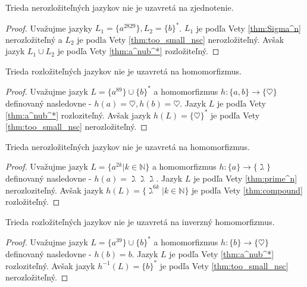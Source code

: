 \begin{theorem}
Trieda nerozložiteľných jazykov nie je uzavretá na zjednotenie.
\end{theorem}

\begin{proof}
Uvažujme jazyky $ L_1 = \lbrace a^{2829} \rbrace, L_2 = \lbrace b \rbrace^* $. $ L_1 $ je podľa Vety \ref{thm:Sigma^n} nerozložiteľný a $ L_2 $ je podla Vety \ref{thm:too_small_nsc} nerozložiteľný. Avšak jazyk $ L_1 \cup L_2 $ je podľa Vety \ref{thm:a^nub^*} rozložiteľný.
\end{proof}

\begin{theorem}
Trieda rozložiteľných jazykov nie je uzavretá na homomorfizmus.
\end{theorem}

\begin{proof}
Uvažujme jazyk $ L = \lbrace a^{89} \rbrace \cup \lbrace b \rbrace^* $ a homomorfizmus $ h : \lbrace a,b \rbrace \rightarrow \lbrace \heartsuit \rbrace $ definovaný nasledovne - $ h(a) = \heartsuit, h(b) = \heartsuit $. Jazyk $ L $ je podľa Vety \ref{thm:a^nub^*} rozloziteľný. Avšak jazyk $ h(L) = \lbrace \heartsuit \rbrace^*$ je podľa Vety \ref{thm:too_small_nsc} nerozložiteľný.
\end{proof}

\begin{theorem}
Trieda nerozložiteľných jazykov nie je uzavretá na homomorfizmus.
\end{theorem}

\begin{proof}
Uvažujme jazyk $ L = \lbrace a^{2k} | k \in \mathbb{N} \rbrace $ a homomorfizmus $ h : \lbrace a \rbrace \rightarrow \lbrace \gimel \rbrace $ definovaný nasledovne - $ h(a) = \gimel\gimel\gimel $. Jazyk $ L $ je podľa Vety \ref{thm:prime^n} nerozloziteľný. Avšak jazyk $ h(L) = \lbrace \gimel^{6k} | k \in \mathbb{N} \rbrace$ je podľa Vety \ref{thm:compound} rozložiteľný.
\end{proof}

\begin{theorem}
Trieda rozložiteľných jazykov nie je uzavretá na inverzný homomorfizmus.
\end{theorem}

\begin{proof}
Uvažujme jazyk $ L = \lbrace a^{39} \rbrace \cup \lbrace b \rbrace^* $ a homomorfizmus $ h : \lbrace b \rbrace \rightarrow \lbrace \heartsuit \rbrace $ definovaný nasledovne - $ h(b) = b $. Jazyk $ L $ je podľa Vety \ref{thm:a^nub^*} rozloziteľný. Avšak jazyk $ h^{-1}(L) = \lbrace b \rbrace^*$ je podľa Vety \ref{thm:too_small_nsc} nerozložiteľný.
\end{proof}

